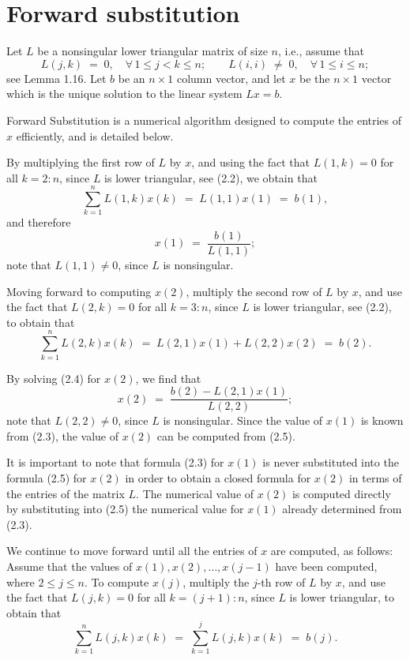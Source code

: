 
\section{Forward substitution}

Let $L$ be a nonsingular lower triangular matrix of size $n$, i.e., assume that
\begin{equation}
L(j,k) \;=\; 0, \quad \forall\, 1\le j<k\le n; \qquad L(i,i) \;\neq\; 0, \quad
\forall\, 1\le i\le n;
\end{equation}
see Lemma 1.16. Let $b$ be an $n\times 1$ column vector, and let $x$ be the $n\times 1$
vector which is the unique solution to the linear system $Lx = b$.

Forward Substitution is a numerical algorithm designed to compute the entries of $x$
efficiently, and is detailed below.

By multiplying the first row of $L$ by $x$, and using the fact that $L(1,k)=0$ for all
$k=2:n$, since $L$ is lower triangular, see (2.2), we obtain that
\[
\sum_{k=1}^n L(1,k)x(k) \;=\; L(1,1)x(1) \;=\; b(1),
\]
and therefore
\begin{equation}
x(1) \;=\; \frac{b(1)}{L(1,1)};
\end{equation}
note that $L(1,1)\neq 0$, since $L$ is nonsingular.

Moving forward to computing $x(2)$, multiply the second row of $L$ by $x$, and use the
fact that $L(2,k)=0$ for all $k=3:n$, since $L$ is lower triangular, see (2.2), to
obtain that
\begin{equation}
\sum_{k=1}^n L(2,k)x(k) \;=\; L(2,1)x(1) + L(2,2)x(2) \;=\; b(2).
\end{equation}

By solving (2.4) for $x(2)$, we find that
\begin{equation}
x(2) \;=\; \frac{b(2) - L(2,1)x(1)}{L(2,2)};
\end{equation}
note that $L(2,2)\neq 0$, since $L$ is nonsingular. Since the value of $x(1)$ is known
from (2.3), the value of $x(2)$ can be computed from (2.5).

It is important to note that formula (2.3) for $x(1)$ is never substituted into the
formula (2.5) for $x(2)$ in order to obtain a closed formula for $x(2)$ in terms of the
entries of the matrix $L$. The numerical value of $x(2)$ is computed directly by
substituting into (2.5) the numerical value for $x(1)$ already determined from (2.3).

We continue to move forward until all the entries of $x$ are computed, as follows:
Assume that the values of $x(1), x(2), \ldots, x(j-1)$ have been computed, where
$2\le j\le n$. To compute $x(j)$, multiply the $j$-th row of $L$ by $x$, and use the
fact that $L(j,k)=0$ for all $k=(j+1):n$, since $L$ is lower triangular, to obtain that
\[
\sum_{k=1}^n L(j,k)x(k) \;=\; \sum_{k=1}^j L(j,k)x(k) \;=\; b(j).
\]


